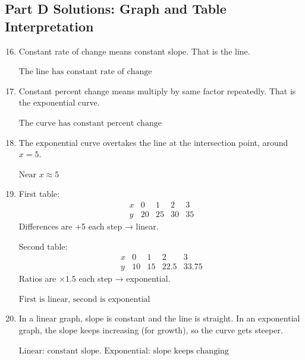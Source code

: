 \documentclass[14pt]{extarticle}
\begin{document}
\subsection*{Part D Solutions: Graph and Table Interpretation}
\begin{enumerate}
  \setcounter{enumi}{15}
  \item Constant rate of change means constant slope. That is the line.

  \(\boxed{\text{The line has constant rate of change}}\)

  \item Constant percent change means multiply by same factor repeatedly. That is the exponential curve.

  \(\boxed{\text{The curve has constant percent change}}\)

  \item The exponential curve overtakes the line at the intersection point, around \(x = 5\).

  \(\boxed{\text{Near } x \approx 5}\)

  \item First table:
  \[
  \begin{array}{c|cccc}
  x & 0 & 1 & 2 & 3 \\ \hline
  y & 20 & 25 & 30 & 35
  \end{array}
  \]
  Differences are +5 each step → linear.

  Second table:
  \[
  \begin{array}{c|cccc}
  x & 0 & 1 & 2 & 3 \\ \hline
  y & 10 & 15 & 22.5 & 33.75
  \end{array}
  \]
  Ratios are \(\times 1.5\) each step → exponential.

  \(\boxed{\text{First is linear, second is exponential}}\)

  \item In a linear graph, slope is constant and the line is straight.  
  In an exponential graph, the slope keeps increasing (for growth), so the curve gets steeper.

  \(\boxed{\text{Linear: constant slope. Exponential: slope keeps changing}}\)
\end{enumerate}
\end{document}
